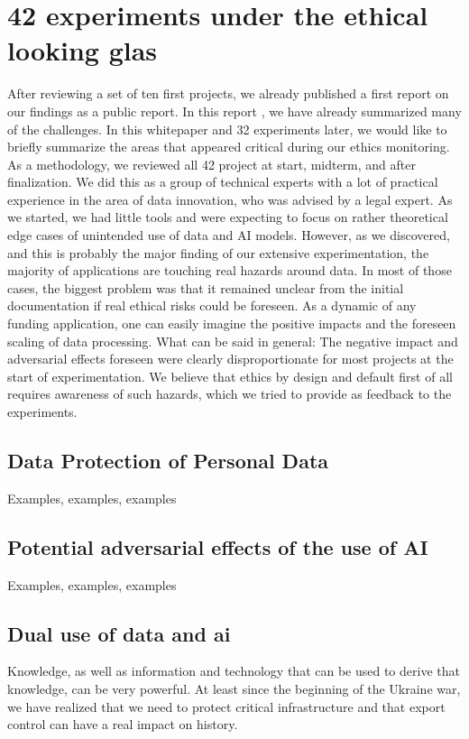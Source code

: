\section{42 experiments under the ethical looking glas}\label{}

After reviewing a set of ten first projects, we already published a first report on our findings as a public report. In this report \cite{DXX}, we have already summarized many of the challenges. In this whitepaper and 32 experiments later, we would like to briefly summarize the areas that appeared critical during our ethics monitoring.
As a methodology, we reviewed all 42 project at start, midterm, and after finalization. We did this as a group of technical experts with a lot of practical experience in the area of data innovation, who was advised by a legal expert. As we started, we had little tools and were expecting to focus on rather theoretical edge cases of unintended use of data and AI models. However, as we discovered, and this is probably the major finding of our extensive experimentation, the majority of applications are touching real hazards around data. In most of those cases, the biggest problem was that it remained unclear from the initial documentation if real ethical risks could be foreseen. As a dynamic of any funding application, one can easily imagine the positive impacts and the foreseen scaling of data processing. What can be said in general: The negative impact and adversarial effects foreseen were clearly disproportionate for most projects at the start of experimentation. We believe that ethics by design and default first of all requires awareness of such hazards, which we tried to provide as feedback to the experiments.

\subsection{Data Protection of Personal Data}\label{}
Examples, examples, examples

\subsection{Potential adversarial effects of the use of AI}\label{}
Examples, examples, examples

\subsection{Dual use of data and ai}
Knowledge, as well as information and technology that can be used to derive that knowledge, can be very powerful. At least since the beginning of the Ukraine war, we have realized that we need to protect critical infrastructure and that export control can have a real impact on history. 





